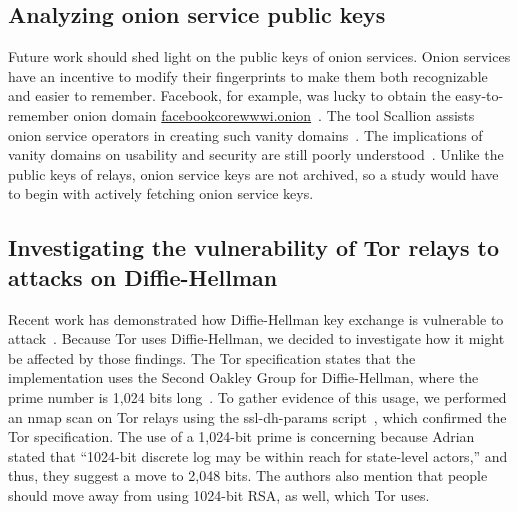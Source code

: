 \subsection{Analyzing onion service public keys}
Future work should shed light on the public keys of onion services.  Onion
services have an incentive to modify their fingerprints to make them both
recognizable and easier to remember.  Facebook, for example, was lucky to
obtain the easy-to-remember onion domain
\url{facebookcorewwwi.onion}~\cite{facebook}.  The tool Scallion assists onion
service operators in creating such vanity domains~\cite{scallion}.  The
implications of vanity domains on usability and security are still poorly
understood~\cite{vanity-domains}.  Unlike the public keys of relays, onion
service keys are not archived, so a study would have to begin with actively
fetching onion service keys.

\subsection{Investigating the vulnerability of Tor relays to attacks on Diffie-Hellman}
Recent work has demonstrated how Diffie-Hellman key exchange is vulnerable to
attack~\cite{Adrian2015a,Valenta2017a,Dorey2017a}.  Because Tor uses
Diffie-Hellman, we decided to investigate how it might be affected by those
findings.  The Tor specification states that the implementation uses the Second
Oakley Group for Diffie-Hellman, where the prime number is 1,024 bits
long~\cite[\S~0.3]{torspec}. To gather evidence of this usage, we performed an
nmap scan on Tor relays using the ssl-dh-params script~\cite{nmapdhscript},
which confirmed the Tor specification. The use of a 1,024-bit prime is
concerning because Adrian \ea~\cite{Adrian2015a} stated that ``1024-bit discrete
log may be within reach for state-level actors,'' and thus, they suggest a move
to 2,048 bits. The authors also mention that people should move away from using
1024-bit RSA, as well, which Tor uses.

